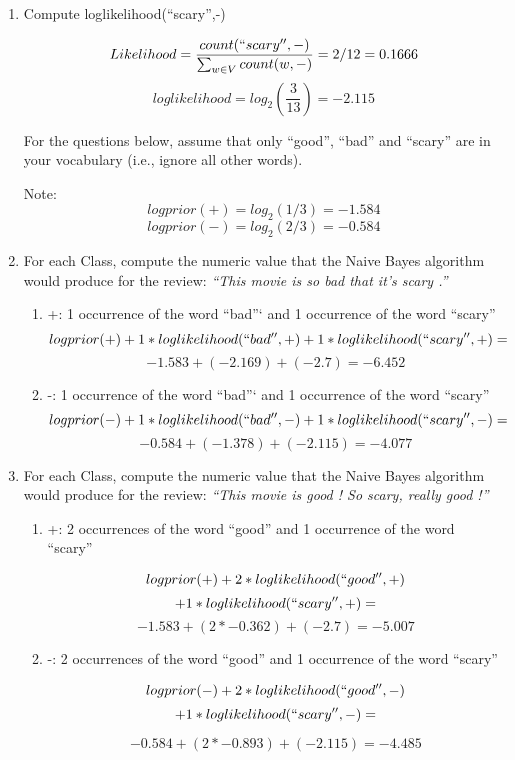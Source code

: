 \documentclass[11pt]{article}
\begin{document}
\begin{enumerate}
\begin{enumerate}
\item Compute loglikelihood(``scary'',-)

$$Likelihood = \frac{count(``scary'', -)}{\sum_{w \in V} count(w, -)} = 2/12 = 0.1666$$
$$loglikelihood = log_2 (\frac{3}{13}) = -2.115$$

\vspace*{.1in}
  For the questions below, assume that only ``good'', ``bad'' and
  ``scary'' are in your vocabulary (i.e., ignore all other words).

  Note: 
  $$logprior(+) = log_2(1/3) = -1.584$$
  $$logprior(-) = log_2(2/3) = -0.584$$

\item For each Class, compute the numeric value that the Naive Bayes algorithm would
  produce for the review: {\it ``This movie is so bad that it's scary .''}
  
  \begin{enumerate}
  \item +: 1 occurrence of the word ``bad''` and 1 occurrence of the word ``scary''
  $$logprior(+) + 1*loglikelihood(``bad'', +) + 1 * loglikelihood(``scary'', +) =$$
  $$ -1.583 + (-2.169) + (-2.7) = -6.452$$
  \item -: 1 occurrence of the word ``bad''` and 1 occurrence of the word ``scary''
  $$logprior(-) + 1*loglikelihood(``bad'', -) + 1 * loglikelihood(``scary'', -) =$$
  $$ -0.584 + (-1.378) + (-2.115) = -4.077$$
  \end{enumerate}
  

\item For each Class, compute the numeric value that the Naive Bayes algorithm would
  produce for the review: {\it ``This movie is good ! So scary, really good !''}
  

  \begin{enumerate}
  \item +: 2 occurrences of the word ``good'' and 1 occurrence of the word ``scary''
  
  $$logprior(+) + 2*loglikelihood(``good'', +)$$
  $$ + 1 * loglikelihood(``scary'', +) =$$
  $$ -1.583 + (2 * -0.362) + (-2.7) = -5.007$$
  
  \item -: 2 occurrences of the word ``good'' and 1 occurrence of the word ``scary''
  
  $$logprior(-) + 2*loglikelihood(``good'', -) $$
  $$+ 1 * loglikelihood(``scary'', -) =$$
  
  $$ -0.584 + (2 * -0.893) + (-2.115) = -4.485$$
  \end{enumerate}
  

\end{enumerate}
\end{enumerate}
\end{document}
